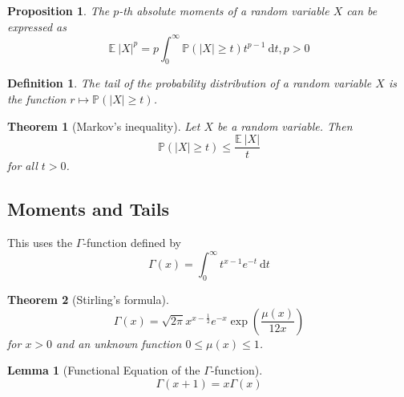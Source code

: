 \documentclass[10pt,a4paper]{article}
\theoremstyle{thmstyle}
\newtheorem{definition}{Definition}
\newtheorem{lemma}{Lemma}
\newtheorem{theorem}{Theorem}
\newtheorem{proposition}{Proposition}
\newcommand{\diff}{~\mathrm{d}}
\newcommand{\E}{\mathbb{E}~}
\renewcommand{\Pr}[1]{\mathbb{P}\left( #1 \right)}
\begin{document}
\begin{proposition}
  The $p$-th absolute moments of a random variable $X$ can be expressed as
  \begin{equation*}
    \E |X|^{p} = p \int_{0}^{\infty} \Pr{|X| \ge t} t^{p - 1} \diff t, p > 0
  \end{equation*}
\end{proposition}

\begin{definition}
  The \emph{tail} of the probability distribution of a random variable $X$ is the function $r \mapsto \Pr{|X| \ge t}$.
\end{definition}

\begin{theorem}[Markov's inequality]
  Let $X$ be a random variable. Then
  \begin{equation*}
    \Pr{|X| \ge t} \le \frac{\E |X|}{t}
  \end{equation*}
  for all $t > 0$.
\end{theorem}

\subsection{Moments and Tails}

This uses the $\Gamma$-function defined by
\begin{equation*}
  \Gamma(x) = \int_{0}^{\infty} t^{x - 1} e^{-t} \diff t
\end{equation*}

\begin{theorem}[Stirling's formula]
  \begin{equation*}
    \Gamma(x) = \sqrt{2\pi} x^{x - \frac{1}{2}} e^{-x} \exp\left( \frac{\mu(x)}{12x} \right)
  \end{equation*}
  for $x > 0$ and an unknown function $0 \le \mu(x) \le 1$.
\end{theorem}

\begin{lemma}[Functional Equation of the $\Gamma$-function]
  \begin{equation*}
    \Gamma(x + 1) = x \Gamma(x)
  \end{equation*}
\end{lemma}
\end{document}
